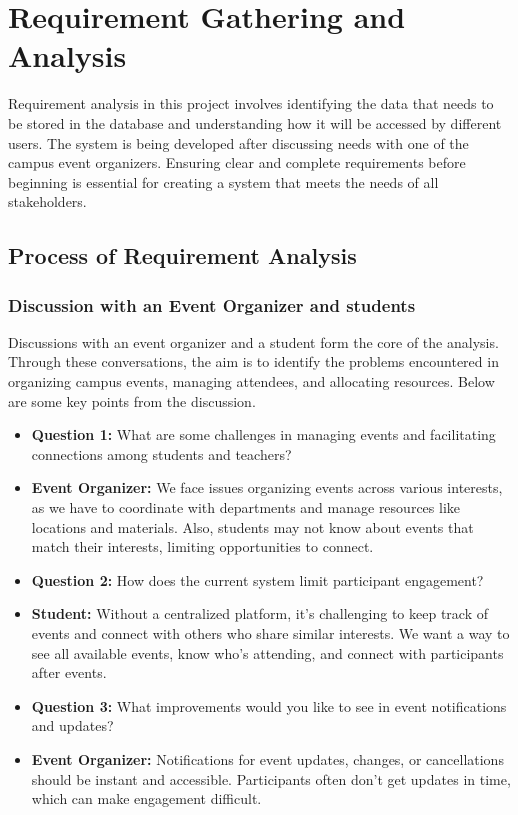 \section{Requirement Gathering and Analysis}

Requirement analysis in this project involves identifying the data that needs to be stored in the database and understanding how it will be accessed by different users. The system is being developed after discussing needs with one of the campus event organizers. Ensuring clear and complete requirements before beginning is essential for creating a system that meets the needs of all stakeholders.

\subsection{Process of Requirement Analysis}

\subsubsection{Discussion with an Event Organizer and students}

Discussions with an event organizer and a student form the core of the analysis. Through these conversations, the aim is to identify the problems encountered in organizing campus events, managing attendees, and allocating resources. Below are some key points from the discussion.
\begin{itemize}
    \item \textbf{Question 1:} What are some challenges in managing events and facilitating connections among students and teachers?

        \item \textbf{Event Organizer:} We face issues organizing events across various interests, as we have to coordinate with departments and manage resources like locations and materials. Also, students may not know about events that match their interests, limiting opportunities to connect.
 
    
    \item \textbf{Question 2:} How does the current system limit participant engagement?

        \item \textbf{Student:} Without a centralized platform, it’s challenging to keep track of events and connect with others who share similar interests. We want a way to see all available events, know who’s attending, and connect with participants after events.

    
    \item \textbf{Question 3:} What improvements would you like to see in event notifications and updates?

        \item \textbf{Event Organizer:} Notifications for event updates, changes, or cancellations should be instant and accessible. Participants often don’t get updates in time, which can make engagement difficult.

\end{itemize}

